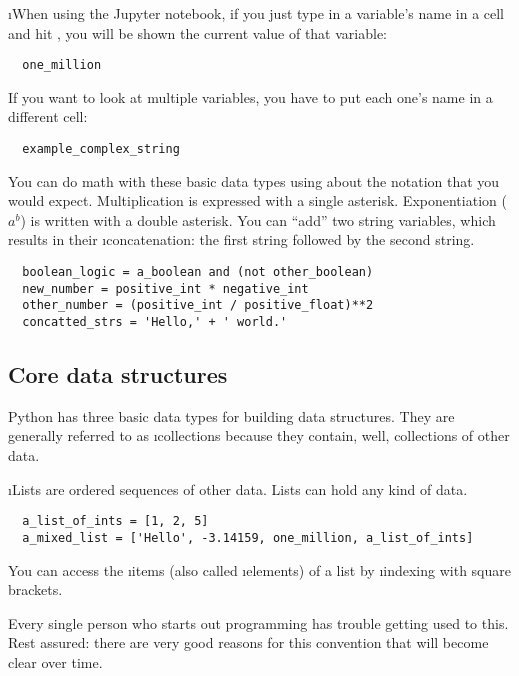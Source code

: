 \documentclass[letterpaper, 12pt, titlepage, twoside]{article}
\begin{document}
\i{When using the Jupyter notebook}, if you just type in a variable's name in
a cell and hit , you will be shown the current value of that
variable:

\begin{lstlisting}
  one_million
\end{lstlisting}

If you want to look at multiple variables, you have to put each one's name in
a different cell:

\begin{lstlisting}
  example_complex_string
\end{lstlisting}

You can do math with these basic data types using about the notation that you
would expect. Multiplication is expressed with a single asterisk.
Exponentiation ($a^b$) is written with a double asterisk. You can ``add'' two
string variables, which results in their \i{concatenation}: the first string
followed by the second string.

\begin{lstlisting}
  boolean_logic = a_boolean and (not other_boolean)
  new_number = positive_int * negative_int
  other_number = (positive_int / positive_float)**2
  concatted_strs = 'Hello,' + ' world.'
\end{lstlisting}

\subsection*{Core data structures}

Python has three basic data types for building data structures. They are
generally referred to as \i{collections} because they contain, well,
collections of other data.

\i{Lists} are
ordered sequences of other data. Lists can hold any kind of data.

\begin{lstlisting}
  a_list_of_ints = [1, 2, 5]
  a_mixed_list = ['Hello', -3.14159, one_million, a_list_of_ints]
\end{lstlisting}

You can access the \i{items} (also called \i{elements}) of a list by
\i{indexing} with square brackets.

\medskip
\begin{center}
\end{center}
\medskip

Every single person who starts out programming has trouble getting used to
this. Rest assured: there are very good reasons for this convention that will
become clear over time.
\end{document}
